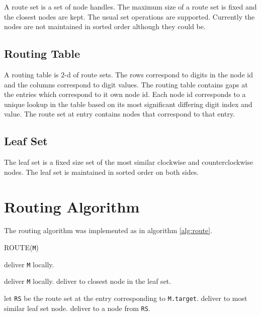 \documentclass{article}
\begin{document}
A route set is a set of node handles.  The maximum size of a route set
is fixed and the closest nodes are kept.  The usual set operations are
supported.  Currently the nodes are not maintained in sorted order
although they could be.

\subsection{Routing Table}

A routing table is $2$-d of route sets.  The rows correspond to digits
in the node id and the columns correspond to digit values.  The
routing table contains gaps at the entries which correspond to it own
node id.  Each node id corresponds to a unique lookup in the table
based on its most significant differing digit index and value.  The
route set at entry contains nodes that correspond to that entry.

\subsection{Leaf Set}

The leaf set is a fixed size set of the most similar clockwise and
counterclockwise nodes.  The leaf set is maintained in sorted order on
both sides.
\section{Routing Algorithm}

The routing algorithm was implemented as in algorithm \ref{alg:route}.

\begin{algorithm}[t]
\caption{ROUTE({\tt M})}
\label{alg:route}
\begin{algorithmic}
\STATE deliver {\tt M} locally.
\ELSE


\STATE deliver {\tt M} locally.
\ELSE
\STATE deliver to closest node in the leaf set.
\ENDIF

\ELSE
\STATE let {\tt RS} be the route set at the entry corresponding to
       {\tt M.target}.
\STATE deliver to most similar leaf set node.
\ELSE
\STATE deliver to a node from {\tt RS}.
\ENDIF
\ENDIF
\ENDIF
\end{algorithmic}
\end{algorithm}
\end{document}
